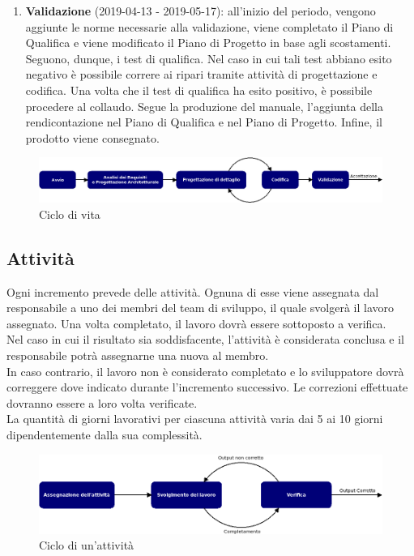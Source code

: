 \begin{enumerate}
	\item \textbf{Validazione} (2019-04-13 - 2019-05-17): all'inizio del periodo, vengono aggiunte le norme necessarie alla validazione, viene completato il Piano di Qualifica e viene modificato il Piano di Progetto in base agli scostamenti. Seguono, dunque, i test di qualifica. Nel caso in cui tali test abbiano esito negativo è possibile correre ai ripari tramite attività di progettazione e codifica. Una volta che il test di qualifica ha esito positivo, è possibile procedere al collaudo. Segue la produzione del manuale, l'aggiunta della rendicontazione nel Piano di Qualifica e nel Piano di Progetto. Infine, il prodotto viene consegnato.
\end{enumerate}

\begin{figure}[h]
	\centering
	\includegraphics[scale=0.4]{images/Model/model.png}
	\caption{Ciclo di vita}
\end{figure}

\subsection{Attività}
Ogni incremento prevede delle attività. Ognuna di esse viene assegnata dal responsabile a uno dei membri del team di sviluppo, il quale svolgerà il lavoro assegnato. Una volta completato, il lavoro dovrà essere sottoposto a verifica.\\
Nel caso in cui il risultato sia soddisfacente, l'attività è considerata conclusa e il responsabile potrà assegnarne una nuova al membro.\\ 
In caso contrario, il lavoro non è considerato completato e lo sviluppatore dovrà correggere dove indicato durante l'incremento successivo. Le correzioni effettuate dovranno essere a loro volta verificate.\\
La quantità di giorni lavorativi per ciascuna attività varia dai 5 ai 10 giorni dipendentemente dalla sua complessità.

\begin{figure}[h]
	\centering
	\includegraphics[scale=0.45]{images/Model/activity.png}
	\caption{Ciclo di un'attività}
\end{figure}
